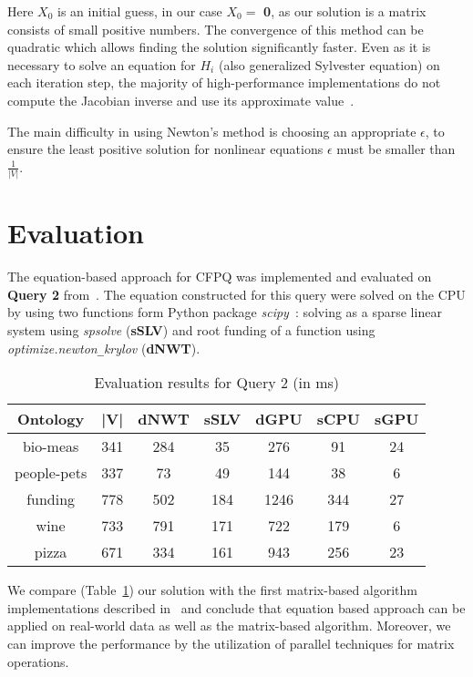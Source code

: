 \documentclass[sigconf]{acmart}
\begin{document}
Here $X_0$ is an initial guess, in our case $X_0 = $ \textbf{0}, as our solution is a matrix consists of small positive numbers. 
The convergence of this method can be quadratic which allows finding the solution significantly faster.
Even as it is necessary to solve an equation for $H_i$ (also generalized Sylvester equation) on each iteration step, the majority of high-performance implementations do not compute the Jacobian inverse and use its approximate value~\cite{knoll2004jacobian}.

The main difficulty in using Newton's method is choosing an appropriate $\epsilon$, to ensure the least positive solution for nonlinear equations $\epsilon$ must be smaller than $\frac{1}{|V|}$.


\section{Evaluation}

The equation-based approach for CFPQ was implemented and evaluated on \textbf{Query 2} from~\cite{azimov2018context}.
The equation constructed for this query were solved on the CPU by using two functions form Python package \textit{scipy}~\cite{scipy}: 
solving as a sparse linear system using \textit{spsolve} (\textbf{sSLV})
and
root funding of a function using \textit{optimize.newton\texttt{\_}krylov} (\textbf{dNWT}).

\begin{table}[h]
\centering
\caption{Evaluation results for Query 2 (in ms)}
\label{tbl2}
\begin{tabular}{ | c | c || c | c || c | c | c |}
\hline
Ontology    & |V| & dNWT & sSLV & dGPU & sCPU &  sGPU \\
\hline                           
\hline                           
bio-meas    & 341 &  284 & 35   & 276  & 91  & 24\\
people-pets & 337 &  73  & 49   & 144  & 38  & 6\\
funding     & 778 &  502 & 184  & 1246 & 344 & 27\\
wine        & 733 &  791 & 171  & 722  & 179 & 6\\
pizza       & 671 &  334 & 161  & 943  & 256 & 23\\
\hline
\end{tabular}

\end{table}

We compare (Table~\ref{tbl2}) our solution with the first matrix-based algorithm implementations described in~\cite{azimov2018context} and conclude that equation based approach can be applied on real-world data as well as the matrix-based algorithm. 
Moreover, we can improve the performance by the utilization of parallel techniques for matrix operations.
\end{document}
